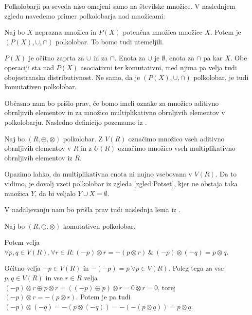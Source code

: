 \documentclass[mat1]{fmfdelo}
\begin{document}
Polkolobarji pa seveda niso omejeni samo na številske množice. V naslednjem zgledu navedemo primer polkolobarja nad množicami:
\begin{zgled} \label{zgled:Potset}
	Naj bo $X$ neprazna množica in $P(X)$ potenčna množica množice $X$. Potem je $(P(X), \cup, \cap)$ polkolobar. To bomo tudi utemeljili.
	
	$P(X)$ je očitno zaprta za $\cup$ in za $\cap$. Enota za $\cup$ je $\emptyset$, enota za $\cap$ pa kar $X$. Obe operaciji sta nad $P(X)$ asociativni ter komutativni, med njima pa velja tudi obojestranska distributivnost. Ne samo, da je $(P(X), \cup, \cap)$ polkolobar, je tudi komutativen polkolobar.
\end{zgled}

Občasno nam bo prišlo prav, če bomo imeli oznake za množico aditivno obrnljivih elementov in za množico multiplikativno obrnljivih elementov v polkolobarju. Nasledno definicijo pozemamo iz \cite[str. $3$]{bib:Tanbase}.

\begin{definicija}
	Naj bo $(R, \oplus, \otimes)$ polkolobar. Z $V(R)$ označimo množico vseh aditivno obrnljivih elementov v $R$ in z $U(R)$ označimo množico vseh multiplikativno obrnljivih elementov iz $R$.
\end{definicija}

Opazimo lahko, da multiplikativna enota ni nujno vsebovana v $V(R)$. Da to vidimo, je dovolj vzeti polkolobar iz zgleda \ref{zgled:Potset}, kjer ne obstaja taka množica $Y$, da bi veljalo $Y \cup X = \emptyset$.

V nadaljevanju nam bo prišla prav tudi naslednja lema iz \cite[Lema 2\,1]{bib:Tanbase}.

\begin{lema} \label{lema:invvpolkolob}
	Naj bo $(R, \oplus, \otimes)$ komutativen polkolobar. 
	
	Potem velja $\forall p, q\in V(R), \forall r\in R: (-p)\otimes r = - (p\otimes r)~\&~ (-p)\otimes(-q) = p\otimes q$.
\end{lema}

\begin{dokaz}
	Očitno velja $-p\in V(R)$ in $-(-p) = p~\forall p\in V(R)$. Poleg tega za vse $p, q\in V(R)$ in vse $r\in R$ velja $(-p)\otimes r \oplus p \otimes r = ((-p) \oplus p)\otimes r = 0\otimes r = 0$, torej $(-p)\otimes r = -(p\otimes r)$. Potem je pa tudi $(-p)\otimes(-q) = -(p\otimes(-q)) = -(-(p\otimes q)) = p\otimes q$.
\end{dokaz}
\end{document}
